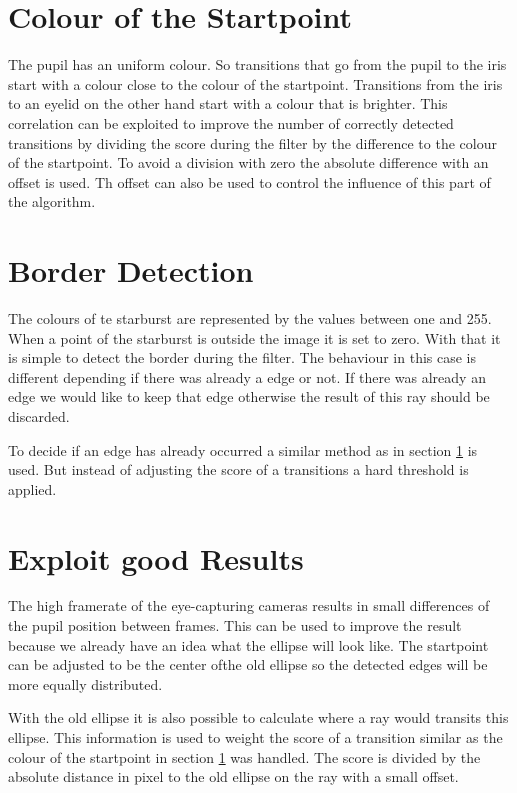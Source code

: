 \section{Colour of the Startpoint}
\label{sec:colorStartpoint}
The pupil has an uniform colour. So transitions that go from the pupil to the iris start with a colour close to the colour of the startpoint. Transitions from the iris to an eyelid on the other hand start with a colour that is brighter. This correlation can be exploited to improve the number of correctly detected transitions by dividing the score during the filter by the difference to the colour of the startpoint. To avoid a division with zero the absolute difference with an offset is used. Th offset can also be used to control the influence of this part of the algorithm.  
\section{Border Detection}
\label{sec:randdetektion}
The colours of te starburst are represented by the values between one and 255. When a point of the starburst is outside the image it is set to zero. With that it is simple to detect the border during the filter. The behaviour in this case is different depending if there was already a edge or not. If there was already an edge we would like to keep that edge otherwise the result of this ray should be discarded. 

To decide if an edge has already occurred a similar method as in section \ref{sec:colorStartpoint} is used. But instead of adjusting the score of a transitions a hard threshold is applied. 
\section{Exploit good Results}
\label{sec:goodResults}

The high framerate of the eye-capturing cameras results in small differences of the pupil position between frames. This can be used to improve the result because we already have an idea what the ellipse will look like. The startpoint can be adjusted to be the center ofthe old ellipse so the detected edges will be more equally distributed.

With the old ellipse it is also possible to calculate where a ray would transits this ellipse. This information is used to weight the score of a transition similar as the colour of the startpoint in section \ref{sec:colorStartpoint} was handled. The score is divided by the absolute distance in pixel to the old ellipse on the ray with a small offset.

